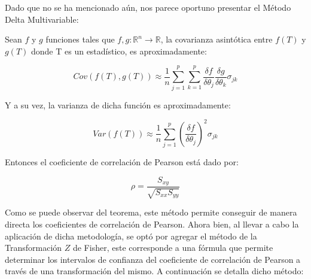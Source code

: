 Dado que no se ha mencionado aún, nos parece oportuno presentar el Método Delta Multivariable:\\

    \begin{theorem} 
        Sean $f$ y $g$ funciones tales que $f,g: \mathbb{R}^n \rightarrow \mathbb{R}$, la covarianza asintótica entre $f(T)$ y $g(T)$ donde T es un estadístico, es aproximadamente:

        \begin{equation*}
            Cov(f(T), g(T)) \approx \frac{1}{n}\sum_{j=1}^p\sum_{k=1}^p\frac{\delta f}{\delta \theta_j}\frac{\delta g}{\delta \theta_k}\sigma_{jk}
        \end{equation*}
        
        Y a su vez, la varianza de dicha función es aproximadamente:
    
        $$Var(f(T)) \approx \frac{1}{n}\sum_{j=1}^p\left(\frac{\delta f}{\delta \theta_j}\right)^2\sigma_{jk}$$
    
        Entonces el coeficiente de correlación de Pearson está dado por:
    
        $$\rho=\frac{S_{xy}}{\sqrt{S_{xx}S_{yy}}}$$

    \end{theorem} 

Como se puede observar del teorema, este método permite conseguir de manera directa los coeficientes de correlación de Pearson. Ahora bien, al llevar a cabo la aplicación de dicha metodología, se optó por agregar el método de la Transformación $Z$ de Fisher, este corresponde a una fórmula que permite determinar los intervalos de confianza del coeficiente de correlación de Pearson a través de una transformación del mismo. A continuación se detalla dicho método:

